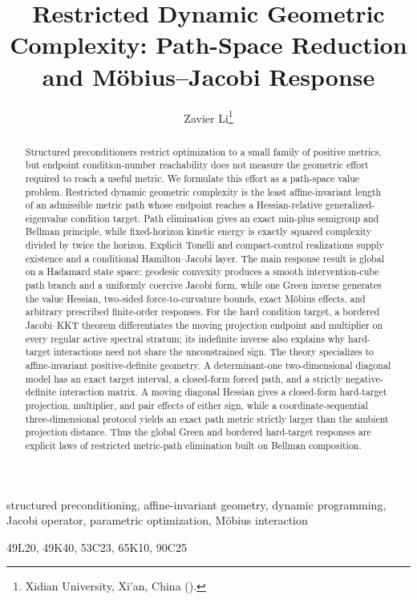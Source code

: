 \documentclass[review,onefignum,onetabnum]{siamart250211}
\title{Restricted Dynamic Geometric Complexity:
Path-Space Reduction and M\"obius--Jacobi Response}
\author{Zavier Li\thanks{Xidian University, Xi'an, China
  (\email{zavierli888@gmail.com}).}}
\begin{document}
\maketitle

\begin{abstract}
Structured preconditioners restrict optimization to a small family of
positive metrics, but endpoint condition-number reachability does not measure
the geometric effort required to reach a useful metric.  We formulate this
effort as a path-space value problem.  Restricted dynamic geometric complexity
is the least affine-invariant length of an admissible metric path whose
endpoint reaches a Hessian-relative generalized-eigenvalue condition target.
Path elimination gives an exact min-plus semigroup and Bellman principle,
while fixed-horizon kinetic energy is exactly squared complexity divided by
twice the horizon.  Explicit Tonelli and compact-control realizations supply
existence and a conditional Hamilton--Jacobi layer.  The main response result
is global on a Hadamard state space: geodesic convexity produces a smooth
intervention-cube path branch and a uniformly coercive Jacobi form, while one
Green inverse generates the value Hessian, two-sided force-to-curvature
bounds, exact M\"obius effects, and arbitrary prescribed finite-order
responses.  For the hard condition
target, a bordered Jacobi--KKT theorem differentiates the moving projection
endpoint and multiplier on every regular active spectral stratum; its
indefinite inverse also explains why hard-target interactions need not share
the unconstrained sign.  The theory specializes to affine-invariant
positive-definite geometry.
A determinant-one two-dimensional diagonal model has an exact target
interval, a closed-form forced path, and a strictly negative-definite
interaction matrix.  A moving diagonal Hessian gives a closed-form hard-target
projection, multiplier, and pair effects of either sign, while a
coordinate-sequential three-dimensional protocol yields an exact path metric
strictly larger than the ambient projection distance.  Thus the global Green
and bordered hard-target responses are explicit laws of restricted metric-path
elimination built on Bellman composition.
\end{abstract}

\begin{keywords}
structured preconditioning, affine-invariant geometry, dynamic programming,
Jacobi operator, parametric optimization, M\"obius interaction
\end{keywords}

\begin{MSCcodes}
49L20, 49K40, 53C23, 65K10, 90C25
\end{MSCcodes}












\appendix


\end{document}

